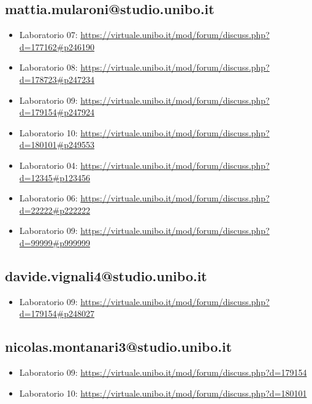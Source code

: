 \documentclass[a4paper,12pt]{report}
\begin{document}
\subsection{mattia.mularoni@studio.unibo.it}

\begin{itemize}
\item Laboratorio 07: \url{https://virtuale.unibo.it/mod/forum/discuss.php?d=177162#p246190}
 \item Laboratorio 08: \url{https://virtuale.unibo.it/mod/forum/discuss.php?d=178723#p247234}
 \item Laboratorio 09: \url{https://virtuale.unibo.it/mod/forum/discuss.php?d=179154#p247924}
 \item Laboratorio 10: \url{https://virtuale.unibo.it/mod/forum/discuss.php?d=180101#p249553}
 \item Laboratorio 04: \url{https://virtuale.unibo.it/mod/forum/discuss.php?d=12345#p123456}
 \item Laboratorio 06: \url{https://virtuale.unibo.it/mod/forum/discuss.php?d=22222#p222222}
 \item Laboratorio 09: \url{https://virtuale.unibo.it/mod/forum/discuss.php?d=99999#p999999}
\end{itemize}

\subsection{davide.vignali4@studio.unibo.it}

\begin{itemize}
 \item Laboratorio 09: \url{https://virtuale.unibo.it/mod/forum/discuss.php?d=179154#p248027}
\end{itemize}

\subsection{nicolas.montanari3@studio.unibo.it}

\begin{itemize}
 \item Laboratorio 09: \url{https://virtuale.unibo.it/mod/forum/discuss.php?d=179154}
 \item Laboratorio 10: \url{https://virtuale.unibo.it/mod/forum/discuss.php?d=180101}
\end{itemize}




\end{document}
